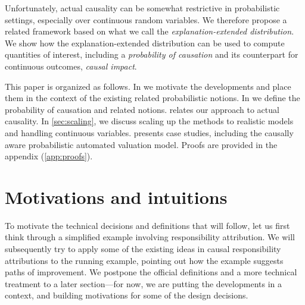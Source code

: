 \documentclass[twoside,11pt]{article}
\renewcommand{\texttt}[1]{\lstinline[basicstyle=\fontsize{8pt}{8.25pt}\selectfont\ttfamily]{#1}}
\begin{document}
Unfortunately, actual causality can be somewhat restrictive in probabilistic settings, especially over continuous random variables. We therefore propose a related framework based on what we call the \emph{explanation-extended distribution}. We show how the explanation-extended distribution can be used to compute quantities of interest, including a \emph{probability of causation} and its counterpart for continuous outcomes, \emph{causal impact}. 

This paper is organized as follows. In  we motivate the developments and place them in the context of the existing related probabilistic notions. In  we define the probability of causation and related notions.   relates our approach to actual causality. In \cref{sec:scaling}, we discuss scaling up the methods to realistic models and handling continuous variables.  presents case studies, including the causally aware probabilistic automated valuation model. Proofs are provided in the appendix (\cref{app:proofs}).  




\section{Motivations and intuitions}
\label{sec:intuitions}

To motivate the technical decisions and definitions that will follow, let us first think through a simplified example involving responsibility attribution. We will subsequently try to apply some of the existing ideas in causal responsibility attributions to the running example, pointing out how the example suggests  paths of improvement. We postpone the official definitions and a more technical treatment to a later section---for now, we are putting the developments in a context, and building motivations for some of the design decisions.
\end{document}
